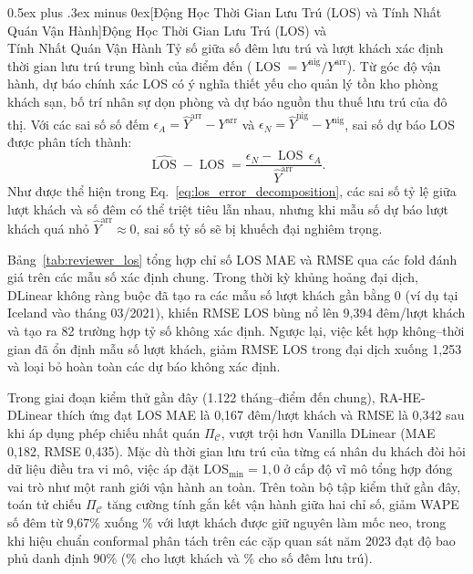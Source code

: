 \documentclass[10pt,journal,compsoc]{IEEEtran}
\makeatletter
\def\subsection{\@startsection{subsection}{2}{\z@}{-1.8ex plus -0.6ex minus -0.3ex}%
{0.5ex plus .3ex minus 0ex}{\normalfont\normalsize\rmfamily\bfseries}}
\makeatother
\begin{document}
\subsection[Động Học Thời Gian Lưu Trú (LOS) và Tính Nhất Quán Vận Hành]{Động Học Thời Gian Lưu Trú (LOS) và\\Tính Nhất Quán Vận Hành}
\label{sec:los_analysis}
Tỷ số giữa số đêm lưu trú và lượt khách xác định thời gian lưu trú trung bình của điểm đến ($\operatorname{LOS} = Y^{\text{nig}} / Y^{\text{arr}}$). Từ góc độ vận hành, dự báo chính xác LOS có ý nghĩa thiết yếu cho quản lý tồn kho phòng khách sạn, bố trí nhân sự dọn phòng và dự báo nguồn thu thuế lưu trú của đô thị. Với các sai số số đếm $\epsilon_A = \hat{Y}^{\text{arr}} - Y^{\text{arr}}$ và $\epsilon_N = \hat{Y}^{\text{nig}} - Y^{\text{nig}}$, sai số dự báo LOS được phân tích thành:
\begin{equation}
\widehat{\operatorname{LOS}}-\operatorname{LOS}
=\frac{\epsilon_N-\operatorname{LOS}\,\epsilon_A}{\hat{Y}^{\mathrm{arr}}}.
\label{eq:los_error_decomposition}
\end{equation}
Như được thể hiện trong Eq.~\eqref{eq:los_error_decomposition}, các sai số tỷ lệ giữa lượt khách và số đêm có thể triệt tiêu lẫn nhau, nhưng khi mẫu số dự báo lượt khách quá nhỏ $\hat{Y}^{\text{arr}} \approx 0$, sai số tỷ số sẽ bị khuếch đại nghiêm trọng.



Bảng~\ref{tab:reviewer_los} tổng hợp chỉ số LOS MAE và RMSE qua các fold đánh giá trên các mẫu số xác định chung. Trong thời kỳ khủng hoảng đại dịch, DLinear không ràng buộc đã tạo ra các mẫu số lượt khách gần bằng 0 (ví dụ tại Iceland vào tháng 03/2021), khiến RMSE LOS bùng nổ lên 9,394 đêm/lượt khách và tạo ra 82 trường hợp tỷ số không xác định. Ngược lại, việc kết hợp không--thời gian đã ổn định mẫu số lượt khách, giảm RMSE LOS trong đại dịch xuống 1,253 và loại bỏ hoàn toàn các dự báo không xác định.

Trong giai đoạn kiểm thử gần đây (1.122 tháng--điểm đến chung), RA-HE-DLinear thích ứng đạt LOS MAE là 0,167 đêm/lượt khách và RMSE là 0,342 sau khi áp dụng phép chiếu nhất quán $\Pi_{\mathcal{C}}$, vượt trội hơn Vanilla DLinear (MAE 0,182, RMSE 0,435). Mặc dù thời gian lưu trú của từng cá nhân du khách đòi hỏi dữ liệu điều tra vi mô, việc áp đặt $\text{LOS}_{\min} = 1{,}0$ ở cấp độ vĩ mô tổng hợp đóng vai trò như một ranh giới vận hành an toàn. Trên toàn bộ tập kiểm thử gần đây, toán tử chiếu $\Pi_{\mathcal{C}}$ tăng cường tính gắn kết vận hành giữa hai chỉ số, giảm WAPE số đêm từ 9,67\% xuống \ReviewerNightsWAPE{}\% với lượt khách được giữ nguyên làm mốc neo, trong khi hiệu chuẩn conformal phân tách trên các cặp quan sát năm 2023 đạt độ bao phủ danh định 90\% (\ReviewerArrivalCoverage{}\% cho lượt khách và \ReviewerNightsCoverage{}\% cho số đêm lưu trú).
\end{document}
